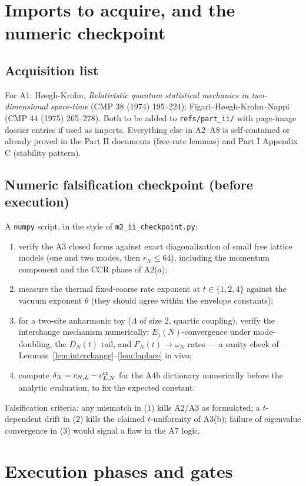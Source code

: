 \documentclass[11pt,a4paper]{article}
\theoremstyle{plain}
\theoremstyle{definition}
\begin{document}
\section{Imports to acquire, and the numeric checkpoint}\label{sec:imports}

\subsection{Acquisition list}
For A1: H{\o}egh-Krohn, \emph{Relativistic quantum statistical mechanics in
two-dimensional space-time} (CMP 38 (1974) 195--224); Figari--H{\o}egh-Krohn--Nappi
(CMP 44 (1975) 265--278). Both to be added to \texttt{refs/part\_ii/} with page-image
dossier entries if used as imports. Everything else in A2--A8 is self-contained or
already proved in the Part II documents (free-rate lemmas) and Part I Appendix C
(stability pattern).

\subsection{Numeric falsification checkpoint (before execution)}
A \texttt{numpy} script, in the style of \texttt{m2\_ii\_checkpoint.py}:
\begin{enumerate}
\item verify the A3 closed forms against exact diagonalization of small free lattice
models (one and two modes, then $r_N\le64$), including the momentum component and the
CCR phase of A2(a);
\item measure the thermal fixed-coarse rate exponent at $t\in\{1,2,4\}$ against the
vacuum exponent $\theta$ (they should agree within the envelope constants);
\item for a two-site anharmonic toy ($\Lambda$ of size $2$, quartic coupling), verify
the interchange mechanism numerically: $E_j(N)$-convergence under mode-doubling, the
$D_N(t)$ tail, and $F_N(t)\to\omega_N$ rates --- a sanity check of
Lemmas~\ref{lem:interchange}--\ref{lem:laplace} in vivo;
\item compute $\delta_N=c_{N,L}-c^{\rm ct}_{L,N}$ for the A4b dictionary numerically
before the analytic evaluation, to fix the expected constant.
\end{enumerate}
Falsification criteria: any mismatch in (1) kills A2/A3 as formulated; a
$t$-dependent drift in (2) kills the claimed $t$-uniformity of A3(b); failure of
eigenvalue convergence in (3) would signal a flaw in the A7 logic.

\section{Execution phases and gates}\label{sec:phases}
\end{document}
